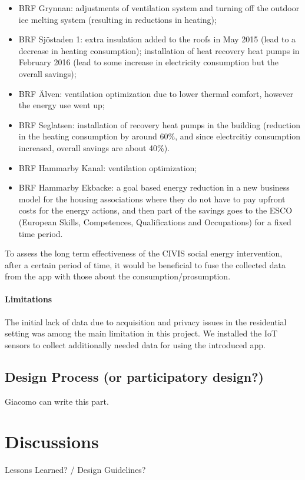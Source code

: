 \begin{itemize}
	\setlength{\itemsep}{0mm}
	\item BRF	Grynnan: adjustments of	ventilation	system and	turning	off	the	outdoor	ice	melting	system (resulting in	reductions	in	heating);
	\item BRF	 Sj\"ostaden	 1: extra	 insulation	 added	 to	 the	 roofs in	May	2015	(lead	to	a	decrease	in	heating	consumption);	 installation	 of	 heat	 recovery	 heat	 pumps	 in	 February	 2016 (lead	 to	 some	 increase	 in	 electricity	 consumption	 but	 the	 overall	savings);
	\item BRF	\"Alven: ventilation	optimization due to lower thermal comfort,	however	the	energy	use	went	up;
	\item BRF	 Seglatsen: installation of recovery	heat	pumps	in	 the	building (reduction in	 the	heating	consumption	by	around	60\%, and since electrcitiy consumption increased, overall savings are	about	40\%).	
	\item BRF	 Hammarby	 Kanal:	 ventilation optimization;
	\item BRF	 Hammarby	 Ekbacke: a goal	 based	 energy	 reduction in	a	new	business	model	for	the	housing	associations	where	 they do not	 have	 to	 pay upfront	costs	for	the energy 	actions, and then part	of	the	savings	goes to	the	 ESCO (European Skills, Competences, Qualifications and Occupations)	 for	 a	 fixed	 time	 period.	
\end{itemize}


To assess the long term effectiveness of the CIVIS social energy intervention,  after a certain period of time, it would be beneficial to fuse the collected data from the app with those about the consumption/prosumption. 

\paragraph{Limitations} The initial lack of data due to acquisition and privacy issues in the residential setting was among the main limitation in this project. We installed the IoT sensors to collect additionally needed data for using the introduced app. 

\subsection{Design Process (or participatory design?)}

\begin{svgraybox}
[note by GP] Giacomo can write this part. 

\end{svgraybox}


\section{Discussions}

\begin{svgraybox}
Lessons Learned?  / Design Guidelines? 
\end{svgraybox}